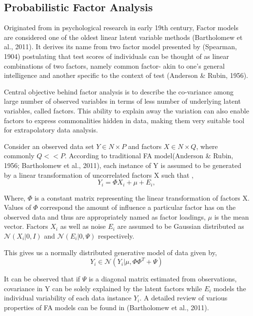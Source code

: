 \subsection{Probabilistic Factor Analysis}
Originated from in psychological research in early 19th century, Factor models are considered one of the oldest linear latent variable methods (Bartholomew et al., 2011). It derives its name from two factor model presented by (Spearman, 1904) postulating that test scores of individuals can be thought of as linear combinations of two factors, namely common factor- akin to one’s general intelligence and another specific to the context of test (Anderson & Rubin, 1956). 

Central objective behind factor analysis is to describe the co-variance among large number of observed variables in terms of less number of underlying latent variables, called factors. This ability to explain away the variation can also enable factors to express commonalities hidden in data, making them very suitable tool for extrapolatory data analysis.

Consider an observed data set ${Y \in N \times P}$ and factors ${X \in N \times Q}$, where commonly ${Q << P}$. According to traditional FA model(Anderson & Rubin, 1956; Bartholomew et al., 2011), each instance of Y is assumed to be generated by a linear transformation of uncorrelated factors X such that , 
\begin{equation}
Y_i = \Phi X_i + \mu + E_i, 
\end{equation}

Where, ${\Phi}$ is a constant matrix representing the linear transformation of factors X. Values of ${\Phi}$ correspond the amount of influence a particular factor has on the observed data and thus are appropriately named as factor loadings, ${\mu}$ is the mean vector. Factors ${X_i}$ as well as noise ${E_i}$ are assumed to be Gaussian distributed as ${\mathcal{N}(X_i| 0, I)}$ and ${\mathcal{N}(E_i | 0,\Psi)}$ respectively. 

This gives us a normally distributed generative model of data given by,
\begin{equation}
Y_i \in \mathcal{N}(Y_i | \mu,  \Phi\Phi^T + \Psi)
\end{equation}

It can be observed that if ${\Psi}$ is a diagonal matrix estimated from observations, covariance in Y can be solely explained by the latent factors while ${E_i}$ models the individual variability of each data instance ${Y_i}$. A detailed review of various properties of FA models can be found in (Bartholomew et al., 2011).

